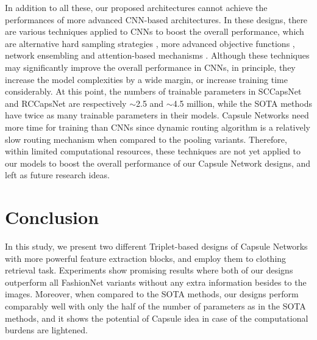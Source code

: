 \documentclass[10pt,twocolumn,letterpaper]{article}
\begin{document}
In addition to all these, our proposed architectures cannot achieve the performances of more advanced CNN-based architectures. In these designs, there are various techniques applied to CNNs to boost the overall performance, which are alternative hard sampling strategies \cite{hdc}, more advanced objective functions \cite{htl,bier}, network ensembling \cite{bier, abe} and attention-based mechanisms \cite{vam,abe}. Although these techniques may significantly improve the overall performance in CNNs, in principle, they increase the model complexities by a wide margin, or increase training time considerably. At this point, the numbers of trainable parameters in SCCapsNet and RCCapsNet are respectively $\sim$2.5 and $\sim$4.5 million, while the SOTA methods have twice as many trainable parameters in their models. Capsule Networks need more time for training than CNNs since dynamic routing algorithm is a relatively slow routing mechanism when compared to the pooling variants. Therefore, within limited computational resources, these techniques are not yet applied to our models to boost the overall performance of our Capsule Network designs, and left as future research ideas.

\section{Conclusion}


In this study, we present two different Triplet-based designs of Capsule Networks with more powerful feature extraction blocks, and employ them to clothing retrieval task. Experiments show promising results where both of our designs outperform all FashionNet variants without any extra information besides to the images. Moreover, when compared to the SOTA methods, our designs perform comparably well with only the half of the number of parameters as in the SOTA methods, and it shows the potential of Capsule idea in case of the computational burdens are lightened.






{\small


}
\end{document}

